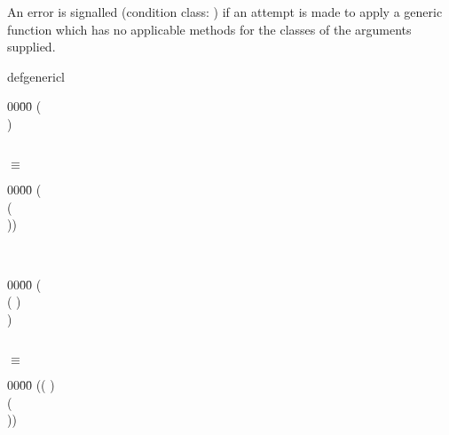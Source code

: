 \begin{optDefinition}
An error is signalled (condition class: 
) if an attempt is made to apply a generic
function which has no applicable methods for the classes of the arguments
supplied.
%
\rewriterules
\label{defgeneric-rewrite-rules}
%
%
\begin{RewriteTable}{defgeneric}{l}
\begin{minipage}[t]{\linewidth}
    \begin{tabbing}
        00\=00\= \kill
        (  \\
        \> )
    \end{tabbing}
\end{minipage}\\
\hspace{2cm}$\equiv$
\begin{minipage}[t]{\linewidth}
    \begin{tabbing}
        00\=00\= \kill
        ( \\
        \>( \\
        \>\> ))
    \end{tabbing}
\end{minipage}\\
%
\begin{minipage}[t]{\linewidth}
    \begin{tabbing}
        00\=00\= \kill
        ( \\
        \>( ) \\
        \> )
    \end{tabbing}
\end{minipage}\\
\hspace{2cm}$\equiv$
\begin{minipage}[t]{\linewidth}
    \begin{tabbing}
        00\=00\= \kill
        (( ) \\
        \>( \\
        \>\>  ))
    \end{tabbing}

\end{minipage}
\end{RewriteTable}
\end{optDefinition}

